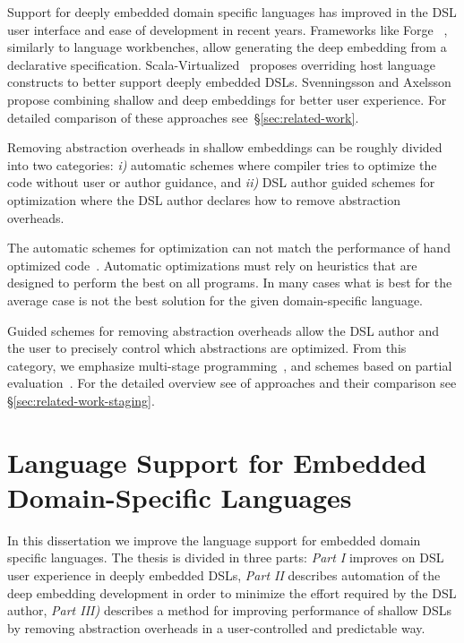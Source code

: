 Support for deeply embedded domain specific languages has improved in the DSL user interface and
ease of development in recent years. Frameworks like Forge~\cite{forge}
, similarly to language workbenches, allow generating the deep embedding from a declarative
specification. Scala-Virtualized~\cite{rompf_scala-virtualized:_2009} proposes overriding
 host language constructs to better support deeply embedded DSLs. Svenningsson and Axelsson~\cite{svenningsson_combining_2012}
 propose combining shallow and deep embeddings for better user experience. For detailed
 comparison of these approaches see~\S \ref{sec:related-work}.

Removing abstraction overheads in shallow embeddings can be roughly
 divided into two categories: \emph{i)} automatic schemes where compiler tries
 to optimize the code without user or author guidance, and \emph{ii)} DSL author
 guided schemes for optimization where the DSL author declares how to remove
 abstraction overheads.

The automatic schemes for optimization can not match the performance of hand optimized
 code~\cite{rompf_optimizing_2013}. Automatic optimizations must rely on heuristics that
 are designed to perform the best on all programs. In many cases what is best for the
 average case is not the best solution for the given domain-specific language.

Guided schemes for removing abstraction overheads allow the DSL author and the user
to precisely control which abstractions are optimized. From this category, we emphasize
multi-stage programming~\cite{taha_multi-stage_1997,taha2004gentle}, and schemes
based on partial evaluation~\cite{jones1993partial,brady2010scrapping}. For the detailed
overview see of approaches and their comparison see \S \ref{sec:related-work-staging}.

\section{Language Support for Embedded Domain-Specific Languages}
\label{sec:improving-language-support}

In this dissertation we improve the language support for embedded domain specific languages. The
 thesis is divided in three parts: \emph{Part I} improves on DSL user experience in deeply embedded DSLs,
 \emph{Part II} describes automation of the deep embedding development in order to minimize
 the effort required by the DSL author, \emph{Part III)} describes a method for improving
 performance of shallow DSLs by removing abstraction overheads in a user-controlled
 and predictable way.

